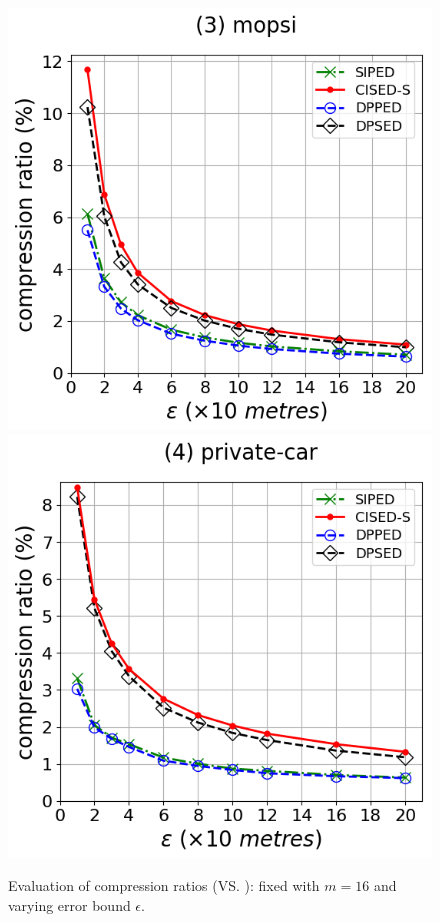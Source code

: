 {\begin{figure}[tb!]
\includegraphics[scale = 0.290]{Figures/Exp-CR-epsilon-ped-mopsi.png}\hspace{1ex}
\includegraphics[scale = 0.290]{Figures/Exp-CR-epsilon-ped-private.png}
\caption{\small Evaluation of compression ratios (\ped VS. \sed): fixed with $m=16$ and varying
  error bound $\epsilon$.}
\label{fig:cr-ped}
\end{figure}

}
